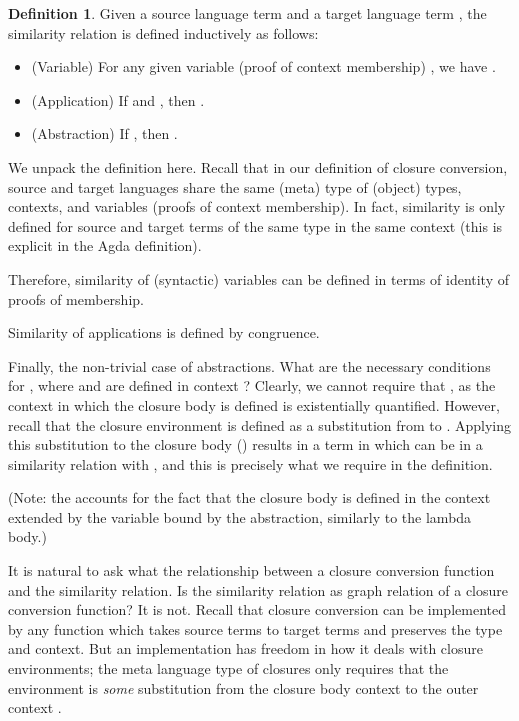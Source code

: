 \documentclass[bsc,frontabs,twoside,singlespacing,parskip,deptreport]{infthesis}
\theoremstyle{definition}
\newtheorem*{definition}{Definition}
\begin{document}
\begin{definition}
  Given a source language term  and a target language term ,
  the similarity relation  is defined inductively as
  follows:

  \begin{itemize}
  \item
    (Variable) For any given variable (proof of context membership) , we have
    .

  \item
    (Application) If  and ,
    then .

  \item
    (Abstraction) If ,
    then .
  \end{itemize}
\end{definition}

We unpack the definition here. Recall that in our definition of
closure conversion, source and target languages share the same (meta)
type of (object) types, contexts, and variables (proofs of context
membership). In fact, similarity is only defined for source and target
terms of the same type in the same context (this is explicit in the Agda
definition). 

Therefore, similarity of (syntactic) variables can be defined in terms
of identity of proofs of membership.

Similarity of applications is defined by congruence.

Finally, the non-trivial case of abstractions. What are the necessary
conditions for , where  and 
 are defined in context ? Clearly, we cannot require
that , as the context  in which the closure body is
defined is existentially quantified. However, recall that the closure environment
 is defined as a substitution from  to . Applying
this substitution to the closure body ()
results in a term in  which can be in a similarity relation with
, and this is precisely what we require in the definition.

(Note: the  accounts for the fact that the closure body is
defined in the context  extended by the variable bound by the
abstraction, similarly to the lambda body.)

It is natural to ask what the relationship between a closure
conversion function and the similarity relation. Is the similarity
relation as graph relation of a closure conversion function? It is
not. Recall that closure conversion can be implemented by any function
which takes source terms to target terms and preserves the type and
context. But an implementation has freedom in how it deals with
closure environments; the meta language type of closures only requires
that the environment is \textit{some} substitution from the closure
body context  to the outer context .
\end{document}
